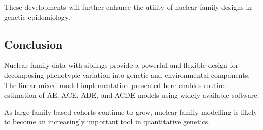 These developments will further enhance the utility of nuclear family
designs in genetic epidemiology.

\subsection{Conclusion}

Nuclear family data with siblings provide a powerful and flexible design
for decomposing phenotypic variation into genetic and environmental
components. The linear mixed model implementation presented here enables
routine estimation of AE, ACE, ADE, and ACDE models using widely available
software.

As large family-based cohorts continue to grow, nuclear family modelling
is likely to become an increasingly important tool in quantitative
genetics.
